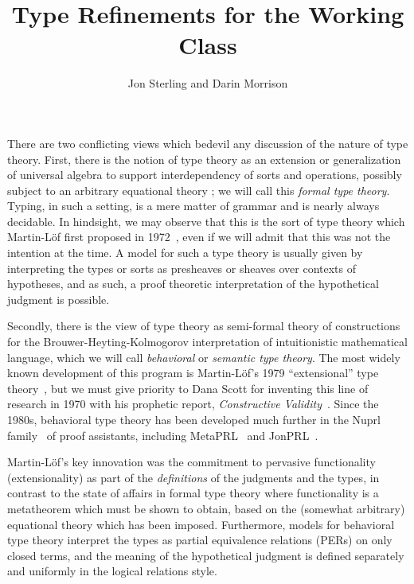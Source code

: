 \documentclass[11pt]{article}
\theoremstyle{definition}
\theoremstyle{notation}
\theoremstyle{remark}
\numberwithin{equation}{section}
\begin{document}
\title{Type Refinements for the Working Class}
\date{}
\author{Jon Sterling and Darin Morrison}
\maketitle

There are two conflicting views which bedevil any discussion of the nature of
type theory. First, there is the notion of type theory as an extension or
generalization of universal algebra to support interdependency of sorts and
operations, possibly subject to an arbitrary equational theory
\cite{cartmell:1986, dybjer:1996}; we will call this \emph{formal type theory}.
Typing, in such a setting, is a mere matter of grammar and is nearly always
decidable. In hindsight, we may observe that this is the sort of type theory
which Martin-L\"of first proposed in 1972~\cite{martin-lof:1972}, even if we
will admit that this was not the intention at the time. A model for such a type
theory is usually given by interpreting the types or sorts as presheaves or
sheaves over contexts of hypotheses, and as such, a proof theoretic
interpretation of the hypothetical judgment is possible.

Secondly, there is the view of type theory as semi-formal theory of
constructions for the Brouwer-Heyting-Kolmogorov interpretation of
intuitionistic mathematical language, which we will call \emph{behavioral} or
\emph{semantic type theory}. The most widely known development of this program
is Martin-L\"of's 1979 ``extensional'' type theory~\cite{martin-lof:1979,
martin-lof:1984}, but we must give priority to Dana Scott for inventing this
line of research in 1970 with his prophetic report, \emph{Constructive
Validity}~\cite{scott:1970}. Since the 1980s, behavioral type theory has been
developed much further in the Nuprl family~\cite{constable:1986} of proof
assistants, including MetaPRL~\cite{hickey:2003} and JonPRL~\cite{jonprl:2015}.

Martin-L\"of's key innovation was the commitment to pervasive functionality
(extensionality) as part of the \emph{definitions} of the judgments and the
types, in contrast to the state of affairs in formal type theory where
functionality is a metatheorem which must be shown to obtain, based on the
(somewhat arbitrary) equational theory which has been imposed. Furthermore,
models for behavioral type theory interpret the types as partial equivalence
relations (PERs) on only closed terms, and the meaning of the hypothetical
judgment is defined separately and uniformly in the logical relations style.
\end{document}
